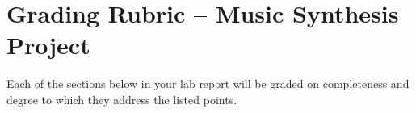 \documentclass[12pt]{article}
\begin{document}

\section{Grading Rubric – Music Synthesis Project}
Each of the sections below in your lab report will be graded on completeness and degree to which they address the listed points. 
\end{document}
